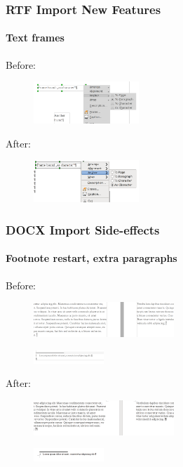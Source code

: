 \documentclass{beamer}
\begin{document}
\begin{frame}
\frametitle{RTF Import New Features}
\framesubtitle{Text frames}
Before:
\begin{figure}[H]
\includegraphics[width=150px,keepaspectratio]{pic/textframe-old.png}
\end{figure}
After:
\begin{figure}[H]
\includegraphics[width=150px,keepaspectratio]{pic/textframe-new.png}
\end{figure}
\end{frame}

\begin{frame}
\frametitle{DOCX Import Side-effects}
\framesubtitle{Footnote restart, extra paragraphs}
Before:
\begin{figure}[H]
\includegraphics[width=200px,keepaspectratio]{pic/docx-footnote-restart-old.png}
\end{figure}
\begin{figure}[H]
\includegraphics[width=100px,keepaspectratio]{pic/docx-footnote-par-old.png}
\end{figure}
After:
\begin{figure}[H]
\includegraphics[width=200px,keepaspectratio]{pic/docx-footnote-restart-new.png}
\end{figure}
\begin{figure}[H]
\includegraphics[width=100px,keepaspectratio]{pic/docx-footnote-par-new.png}
\end{figure}
\end{frame}
\end{document}
